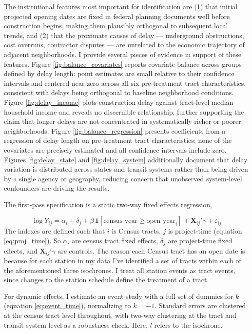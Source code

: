 \documentclass[12pt]{article}
\begin{document}
The institutional features most important for identification are (1) that initial projected opening dates are fixed in federal planning documents well before construction begins, making them plausibly orthogonal to subsequent local trends, and (2) that the proximate causes of delay --- underground obstructions, cost overruns, contractor disputes --- are unrelated to the economic trajectory of adjacent neighborhoods. I provide several pieces of evidence in support of these features. Figure \ref{fig:balance_covariates} reports covariate balance across groups defined by delay length: point estimates are small relative to their confidence intervals and centered near zero across all six pre-treatment tract characteristics, consistent with delays being orthogonal to baseline neighborhood conditions. Figure \ref{fig:delay_income} plots construction delay against tract-level median household income and reveals no discernible relationship, further supporting the claim that longer delays are not concentrated in systematically richer or poorer neighborhoods. Figure \ref{fig:balance_regression} presents coefficients from a regression of delay length on pre-treatment tract characteristics; none of the covariates are precisely estimated and all confidence intervals include zero. Figures \ref{fig:delay_state} and \ref{fig:delay_system} additionally document that delay variation is distributed across states and transit systems rather than being driven by a single agency or geography, reducing concern that unobserved system-level confounders are driving the results.

The first-pass specification is a static two-way fixed effects regression,

$$\log Y_{ij} = \alpha_i + \delta_j + \beta\, \mathbf{1}[\text{census year} \geq \text{open year}_i] + \mathbf{X}_{ij}'\gamma + \varepsilon_{ij}$$
The indexes are defined such that $i$ is Census tracts, $j$ is project-time (equation \ref{eq:proj_time}). So $\alpha_i$ are census tract fixed effects, $\delta_j$ are project-time fixed effects, and $\mathbf{X}_{ij}'\gamma$ are controls. The reason each Census tract has an open date is because for each station in my data I've identified a set of tracts within each of the aforementioned three isochrones. I treat all station events as tract events, since changes to the station schedule define the treatment of a tract. 

For dynamic effects, I estimate an event study with a full set of dummies for $k$ (equation \ref{eq:event_time}), normalizing to $k = -1$. Standard errors are clustered at the census tract level throughout, with two-way clustering at the tract and transit-system level as a robustness check. Here, $l$ refers to the isochrone.
\end{document}
